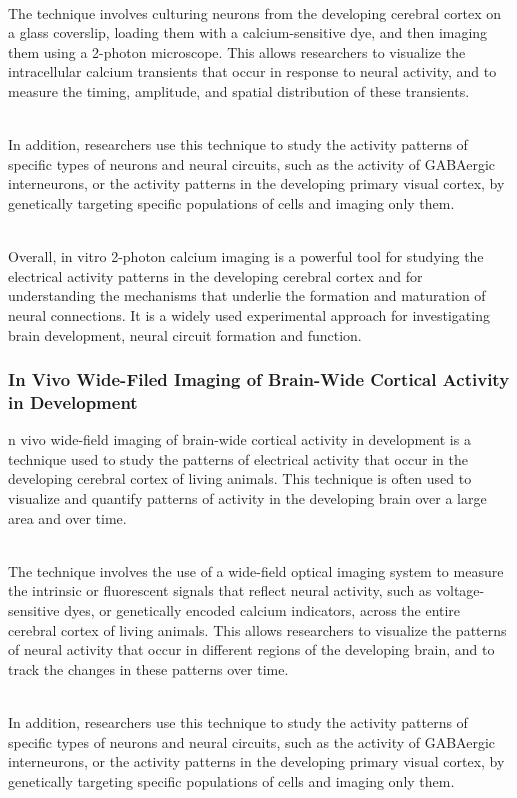 \begin{itemize}
\begin{itemize}
\\The technique involves culturing neurons from the developing cerebral cortex on a glass coverslip, loading them with a calcium-sensitive dye, and then imaging them using a 2-photon microscope. This allows researchers to visualize the intracellular calcium transients that occur in response to neural activity, and to measure the timing, amplitude, and spatial distribution of these transients.

\\In addition, researchers use this technique to study the activity patterns of specific types of neurons and neural circuits, such as the activity of GABAergic interneurons, or the activity patterns in the developing primary visual cortex, by genetically targeting specific populations of cells and imaging only them.

\\Overall, in vitro 2-photon calcium imaging is a powerful tool for studying the electrical activity patterns in the developing cerebral cortex and for understanding the mechanisms that underlie the formation and maturation of neural connections. It is a widely used experimental approach for investigating brain development, neural circuit formation and function.


\subsubsection{In Vivo Wide-Filed Imaging of Brain-Wide Cortical Activity in Development}
n vivo wide-field imaging of brain-wide cortical activity in development is a technique used to study the patterns of electrical activity that occur in the developing cerebral cortex of living animals. This technique is often used to visualize and quantify patterns of activity in the developing brain over a large area and over time.

\\The technique involves the use of a wide-field optical imaging system to measure the intrinsic or fluorescent signals that reflect neural activity, such as voltage-sensitive dyes, or genetically encoded calcium indicators, across the entire cerebral cortex of living animals. This allows researchers to visualize the patterns of neural activity that occur in different regions of the developing brain, and to track the changes in these patterns over time.

\\In addition, researchers use this technique to study the activity patterns of specific types of neurons and neural circuits, such as the activity of GABAergic interneurons, or the activity patterns in the developing primary visual cortex, by genetically targeting specific populations of cells and imaging only them.

\end{itemize}
\end{itemize}
